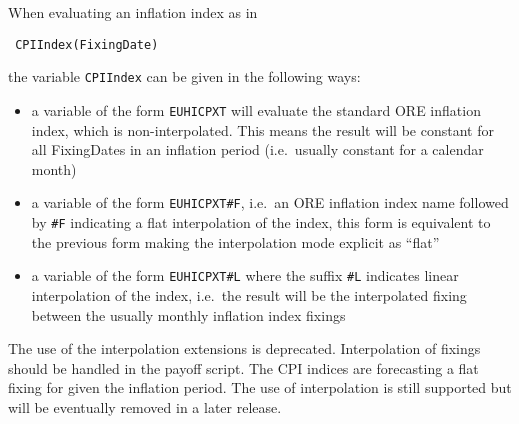 When evaluating an inflation index as in

\begin{verbatim}
 CPIIndex(FixingDate)
\end{verbatim}

the variable \verb+CPIIndex+ can be given in the following ways:

\begin{itemize}
\item a variable of the form \verb+EUHICPXT+ will evaluate the standard ORE inflation index, which is
  non-interpolated. This means the result will be constant for all FixingDates in an inflation period (i.e.\ usually
  constant for a calendar month)
\item a variable of the form \verb+EUHICPXT#F+, i.e.\ an ORE inflation index name followed by \verb+#F+ indicating a flat
  interpolation of the index, this form is equivalent to the previous form making the interpolation mode explicit as
  ``flat''
\item a variable of the form \verb+EUHICPXT#L+ where the suffix \verb+#L+ indicates linear interpolation of the index,
  i.e.\ the result will be the interpolated fixing between the usually monthly inflation index fixings
\end{itemize}

The use of the interpolation extensions is deprecated. 
Interpolation of fixings should be handled in the payoff script. The CPI indices are forecasting a flat fixing for given the inflation period.
The use of interpolation is still supported but will be eventually removed in a later release.